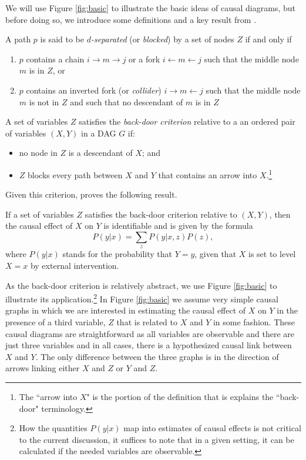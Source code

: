 \documentclass[11pt,reqno]{amsart}
\begin{document}
\begin{doublespace}
We will use Figure \ref{fig:basic} to illustrate the basic ideas of causal diagrams, but before doing so, we introduce some definitions and a key result from \citet{Pearl:2009vo}.

\begin{definition}
A path $p$ is said to be \emph{$d$-separated} (or \emph{blocked}) by a set of nodes $Z$ if and only if
\begin{enumerate}
	\item $p$ contains a chain $i \rightarrow m \rightarrow j$ or a fork $i \leftarrow m \leftarrow j$ such that the middle node $m$ is in $Z$, or
	\item $p$ contains an inverted fork (or \emph{collider}) $i \rightarrow m \leftarrow j$ such that the middle node $m$ is not in $Z$ and such that no descendant of $m$ is in $Z$
\end{enumerate}
\end{definition}

\begin{definition}
A set of variables $Z$ satisfies the \emph{back-door criterion} relative to a an ordered pair of variables $(X, Y)$ in a 
	DAG $G$ if:
	\begin{itemize}
		\item no node in $Z$ is a descendant of $X$; and
		\item $Z$ blocks every path between $X$ and $Y$ that contains an arrow into $X$.\footnote{The ``arrow into $X$" is the portion of the definition that is explains the ``back-door" terminology.}
	\end{itemize}
\end{definition}
Given this criterion, \citet[p.\,79]{Pearl:2009vo} proves the following result.
\begin{theorem}
	If a set of variables $Z$ satisfies the back-door criterion relative to $(X, Y)$, then the causal effect of $X$ on $Y$ is identifiable and is given by the formula 
	\[ P(y | x) = \sum_{z} P(y | x, z) P(z), \]
where $P(y|x)$ stands for the probability that $Y = y$, given that $X$ is set to level $X=x$ by external intervention.
\end{theorem}

As the back-door criterion is relatively abstract, we use Figure \ref{fig:basic} to illustrate its application.\footnote{
How the quantities $P(y|x)$ map into estimates of causal effects is not critical to the current discussion, it suffices to note that in a given setting, it can be calculated if the needed variables are observable.}
In Figure \ref{fig:basic} we assume very simple causal graphs in which we are interested in estimating the causal effect of $X$ on $Y$ in the presence of a third variable, $Z$ that is related to $X$ and $Y$ in some fashion.
These causal diagrams are straightforward as all variables are observable and there are just three variables and in all cases, there is a hypothesized causal link between $X$ and $Y$.
The only difference between the three graphs is in the direction of arrows linking either $X$ and $Z$ or $Y$ and $Z$.


\end{doublespace}
\end{document}
